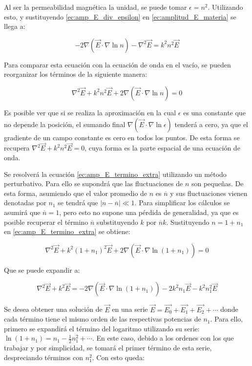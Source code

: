 Al ser la permeabilidad magnética la unidad, se puede tomar $\epsilon = n^2$. Utilizando esto, y sustituyendo \ref{ec:amp_E_div_epsilon} en \ref{ec:amplitud_E_materia} se llega a:

\begin{equation}
    -2\nabla(\vec{E} \cdot \nabla \ln n) - \nabla^2 \vec{E} = k^2 n^2\vec{E}
\end{equation}

Para comparar esta ecuación con la ecuación de onda en el vacío, se pueden reorganizar los términos de la siguiente manera:

\begin{equation}\label{ec:amp_E_termino_extra}
     \nabla^2 \vec{E} + k^2 n^2\vec{E} + 2\nabla(\vec{E} \cdot \nabla \ln n) = 0
\end{equation}

Es posible ver que si se realiza la aproximación en la cual $\epsilon$ es una constante que no depende la posición, el sumando final $\nabla(\vec{E} \cdot \nabla \ln \epsilon)$ tenderá a cero, ya que el gradiente de un campo constante es cero en todos los puntos. De esta forma se recupera $\nabla^2 \vec{E} + k^2 n^2\vec{E} = 0$, cuya forma es la parte espacial de una ecuación de onda.

Se resolverá la ecuación \ref{ec:amp_E_termino_extra} utilizando un método perturbativo. Para ello se supondrá que las fluctuaciones de $n$ son pequeñas. De esta forma, asumiendo que el valor promedio de $n$ es $\overline{n}$ y sus fluctuaciones vienen denotadas por $n_1$ se tendrá que $|n-\overline{n}| \ll 1$. Para simplificar los cálculos se asumirá que $\overline{n} = 1$, pero esto no supone una pérdida de generalidad, ya que es posible recuperar el término $\overline{n}$ substituyendo $k$ por $\overline{n}k$. Sustituyendo $n = 1 + n_1$ en \ref{ec:amp_E_termino_extra} se obtiene:

\begin{equation}
     \nabla^2 \vec{E} + k^2 (1+n_1)^2\vec{E} + 2\nabla(\vec{E} \cdot \nabla \ln (1+n_1)) = 0
\end{equation}

Que se puede expandir a:

\begin{equation}
     \nabla^2 \vec{E} + k^2 \vec{E}= - 2\nabla(\vec{E} \cdot \nabla \ln (1+n_1)) - 2k^2n_1 \vec{E} - k^2n_1^2 \vec{E}
\end{equation}

Se desea obtener una solución de $\vec{E}$ en una serie $\vec{E} = \vec{E_0} + \vec{E_1} + \vec{E_2}+\cdots$ donde cada término tiene el mismo orden de las respectivas potencias de $n_1$. Para ello, primero se expandirá el término del logaritmo utilizando su serie: $\ln(1+n_1) = n_1-\frac{1}{2}n_1^2+ \cdots$. En este caso, debido a los ordenes con los que trabajar y por simplicidad, se tomará el primer término de esta serie, despreciando términos con $n_1^2$. Con esto queda: 

